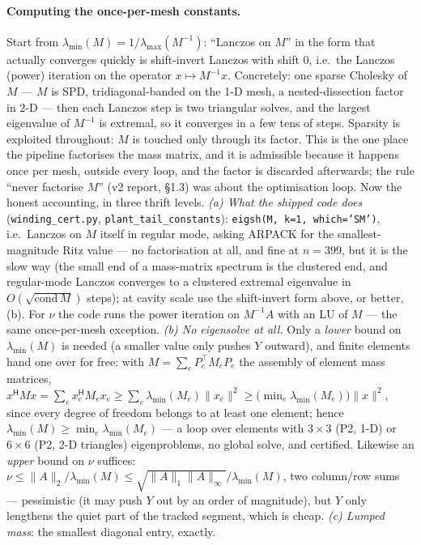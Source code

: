 \documentclass[11pt,a4paper]{article}
\newcommand{\code}[1]{\texttt{#1}}
\newcommand{\hp}{^{\mathsf H}}
\begin{document}
{\paragraph{Computing the once-per-mesh constants.}
Start from $\lambda_{\min}(M)=1/\lambda_{\max}(M^{-1})$: ``Lanczos
on $M$'' in the form that actually converges quickly is shift-invert Lanczos with shift
$0$, i.e.\ the Lanczos (power) iteration on the operator $x\mapsto M^{-1}x$.  Concretely:
one sparse Cholesky of $M$ --- $M$ is SPD, tridiagonal-banded on the 1-D mesh, a
nested-dissection factor in 2-D --- then each Lanczos step is two triangular solves, and
the largest eigenvalue of $M^{-1}$ is extremal, so it converges in a few tens of steps.
Sparsity is exploited throughout: $M$ is touched only through its factor.  This is the one
place the pipeline factorises the mass matrix, and it is admissible because it happens
once per mesh, outside every loop, and the factor is discarded afterwards; the rule
``never factorise $M$'' (v2 report, \S1.3) was about the optimisation loop.  Now the
honest accounting, in three thrift levels.  \emph{(a) What the shipped code does}
(\code{winding\_cert.py}, \code{plant\_tail\_constants}): \code{eigsh(M, k=1,
which='SM')}, i.e.\ Lanczos on $M$ itself in regular mode, asking ARPACK for the
smallest-magnitude Ritz value --- no factorisation at all, and fine at $n=399$, but it is
the slow way (the small end of a mass-matrix spectrum is the clustered end, and
regular-mode Lanczos converges to a clustered extremal eigenvalue in
$O(\sqrt{\mathrm{cond}\,M})$ steps); at cavity scale use the shift-invert form above, or
better, (b).  For $\nu$ the code runs the power iteration on $M^{-1}A$ with an LU of $M$
--- the same once-per-mesh exception.  \emph{(b) No eigensolve at all.}  Only a
\emph{lower} bound on $\lambda_{\min}(M)$ is needed (a smaller value only pushes $Y$
outward), and finite elements hand one over for free: with $M=\sum_e P_e^{\!\top}M_eP_e$
the assembly of element mass matrices,
$x\hp Mx=\sum_e x_e\hp M_ex_e\ge\sum_e\lambda_{\min}(M_e)\|x_e\|^2
\ge\bigl(\min_e\lambda_{\min}(M_e)\bigr)\|x\|^2$, since every degree of freedom belongs to
at least one element; hence $\lambda_{\min}(M)\ge\min_e\lambda_{\min}(M_e)$ --- a loop over
elements with $3\times3$ (P2, 1-D) or $6\times6$ (P2, 2-D triangles) eigenproblems, no
global solve, and certified.  Likewise an \emph{upper} bound on $\nu$ suffices:
$\nu\le\|A\|_2/\lambda_{\min}(M)\le\sqrt{\|A\|_1\|A\|_\infty}/\lambda_{\min}(M)$, two
column/row sums --- pessimistic (it may push $Y$ out by an order of magnitude), but $Y$
only lengthens the quiet part of the tracked segment, which is cheap.  \emph{(c) Lumped
mass}: the smallest diagonal entry, exactly.
}
\end{document}
